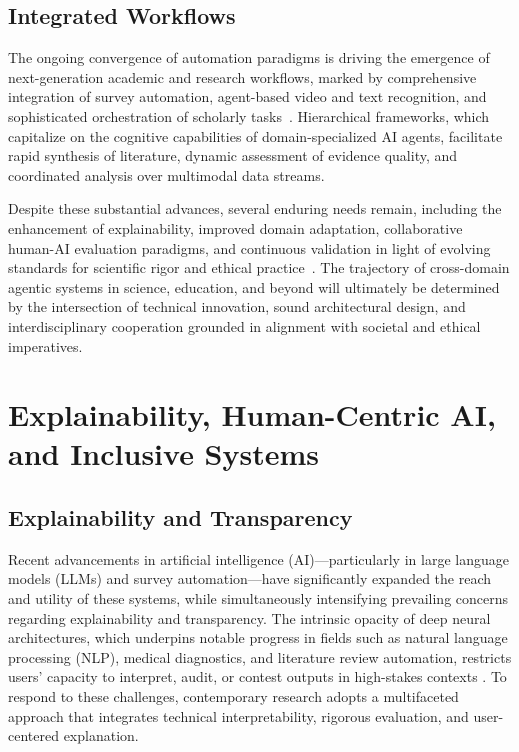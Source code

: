 \documentclass[sigconf]{acmart}
\begin{document}
\subsection{Integrated Workflows}

The ongoing convergence of automation paradigms is driving the emergence of next-generation academic and research workflows, marked by comprehensive integration of survey automation, agent-based video and text recognition, and sophisticated orchestration of scholarly tasks~\cite{ref25,ref26,ref27,ref29,ref30,ref45,ref86,ref99,ref100,ref104,ref110,ref111,ref113}. Hierarchical frameworks, which capitalize on the cognitive capabilities of domain-specialized AI agents, facilitate rapid synthesis of literature, dynamic assessment of evidence quality, and coordinated analysis over multimodal data streams. 

Despite these substantial advances, several enduring needs remain, including the enhancement of explainability, improved domain adaptation, collaborative human-AI evaluation paradigms, and continuous validation in light of evolving standards for scientific rigor and ethical practice~\cite{ref30,ref45,ref86,ref99,ref100,ref104,ref110,ref111,ref113,ref114,ref115}. The trajectory of cross-domain agentic systems in science, education, and beyond will ultimately be determined by the intersection of technical innovation, sound architectural design, and interdisciplinary cooperation grounded in alignment with societal and ethical imperatives.

\section{Explainability, Human-Centric AI, and Inclusive Systems}

\subsection{Explainability and Transparency}

Recent advancements in artificial intelligence (AI)—particularly in large language models (LLMs) and survey automation—have significantly expanded the reach and utility of these systems, while simultaneously intensifying prevailing concerns regarding explainability and transparency. The intrinsic opacity of deep neural architectures, which underpins notable progress in fields such as natural language processing (NLP), medical diagnostics, and literature review automation, restricts users’ capacity to interpret, audit, or contest outputs in high-stakes contexts \cite{ref36,ref38,ref39,ref46,ref47,ref62,ref63,ref64,ref65,ref68,ref76,ref80,ref82,ref83,ref102,ref103,ref106}. To respond to these challenges, contemporary research adopts a multifaceted approach that integrates technical interpretability, rigorous evaluation, and user-centered explanation.
\end{document}
